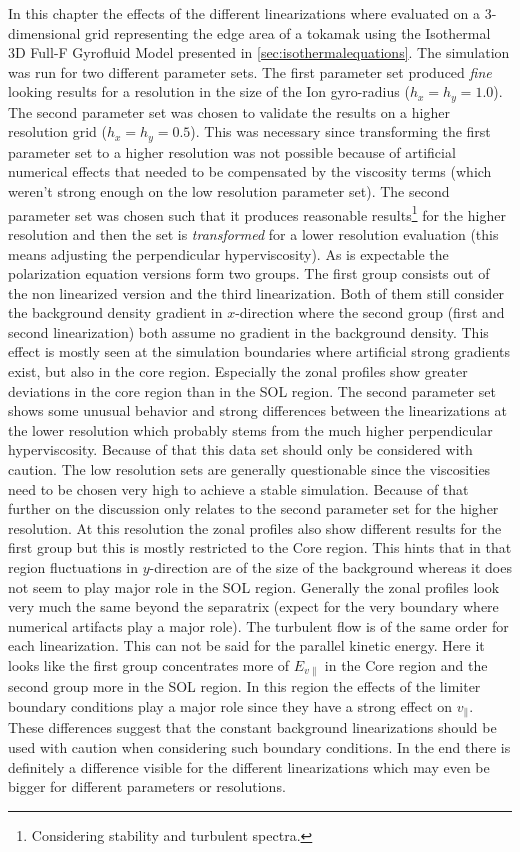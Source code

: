 \documentclass[master.tex]{subfiles}
\begin{document}
In this chapter the effects of the different linearizations where evaluated on a 3-dimensional grid representing the edge area of a tokamak using the Isothermal 3D Full-F Gyrofluid Model presented in \autoref{sec:isothermalequations}. The simulation was run for two different parameter sets. The first parameter set produced \textit{fine} looking results for a resolution in the size of the Ion gyro-radius ($h_x=h_y=1.0$). The second parameter set was chosen to validate the results on a higher resolution grid ($h_x=h_y=0.5$). This was necessary since transforming the first parameter set to a higher resolution was not possible because of artificial numerical effects that needed to be compensated by the viscosity terms (which weren't strong enough on the low resolution parameter set). The second parameter set was chosen such that it produces reasonable results\footnote{Considering stability and turbulent spectra.} for the higher resolution and then the set is \textit{transformed} for a lower resolution evaluation (this means adjusting the perpendicular hyperviscosity).\newline
As is expectable the polarization equation versions form two groups. The first group consists out of the non linearized version and the third linearization. Both of them still consider the background density gradient in $x$-direction where the second group (first and second linearization) both assume no gradient in the background density. This effect is mostly seen at the simulation boundaries where artificial strong gradients exist, but also in the core region. Especially the zonal profiles show greater deviations in the core region than in the SOL region.\newline
The second parameter set shows some unusual behavior and strong differences between the linearizations at the lower resolution which probably stems from the much higher perpendicular hyperviscosity. Because of that this data set should only be considered with caution.\newline
The low resolution sets are generally questionable since the viscosities need to be chosen very high to achieve a stable simulation. Because of that further on the discussion only relates to the second parameter set for the higher resolution.\newline
At this resolution the zonal profiles also show different results for the first group but this is mostly restricted to the Core region. This hints that in that region fluctuations in $y$-direction are of the size of the background whereas it does not seem to play major role in the \ac{SOL} region.  Generally the zonal profiles look very much the same beyond the separatrix (expect for the very boundary where numerical artifacts play a major role). The turbulent flow is of the same order for each linearization. This can not be said for the parallel kinetic energy. Here it looks like the first group concentrates more of $E_{v\parallel}$ in the Core region and the second group more in the \ac{SOL} region. In this region the effects of the limiter boundary conditions play a major role since they have a strong effect on $v_{\parallel}$. These differences suggest that the constant background linearizations should be used with caution when considering such boundary conditions.\newline
In the end there is definitely a difference visible for the different linearizations which may even be bigger for different parameters or resolutions.
\end{document}
